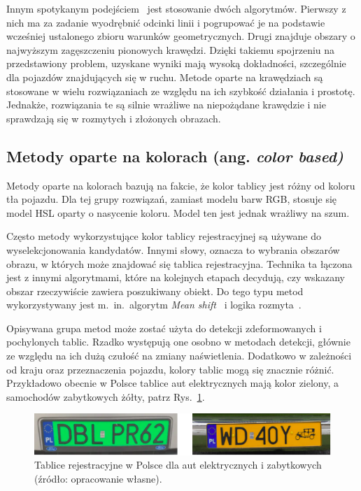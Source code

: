 Innym spotykanym podejściem~\cite{4410602} jest stosowanie dwóch algorytmów.
Pierwszy z nich ma za zadanie wyodrębnić odcinki linii i pogrupować je na podstawie wcześniej ustalonego zbioru warunków geometrycznych.
Drugi znajduje obszary o najwyższym zagęszczeniu pionowych krawędzi.
Dzięki takiemu spojrzeniu na przedstawiony problem, uzyskane wyniki mają wysoką dokładności, szczególnie dla pojazdów znajdujących się w ruchu.
Metode oparte na krawędziach są stosowane w wielu rozwiązaniach ze względu na ich szybkość działania i prostotę.
Jednakże, rozwiązania te są silnie wrażliwe na niepożądane krawędzie i nie sprawdzają się w rozmytych i złożonych obrazach.

\subsection{Metody oparte na kolorach (ang. \textit{color based)}}
\label{subsec:color-based}
Metody oparte na kolorach bazują na fakcie, że kolor tablicy jest różny od koloru tła pojazdu.
Dla tej grupy rozwiązań, zamiast modelu barw RGB, stosuje się model HSL oparty o nasycenie koloru.
Model ten jest jednak wrażliwy na szum.

Często metody wykorzystujące kolor tablicy rejestracyjnej są używane do wyselekcjonowania kandydatów.
Innymi słowy, oznacza to wybrania obszarów obrazu, w których może znajdować się tablica rejestracyjna.
Technika ta łączona jest z innymi algorytmami, które na kolejnych etapach decydują, czy wskazany obszar rzeczywiście zawiera poszukiwany obiekt.
Do tego typu metod wykorzystywany jest m.\ in.\ algorytm \textit{Mean shift}~\cite{1520110} i logika rozmyta~\cite{Wang2008FuzzybasedAF}.

Opisywana grupa metod może zostać użyta do detekcji zdeformowanych i pochylonych tablic.
Rzadko występują one osobno w metodach detekcji, głównie ze względu na ich dużą czułość na zmiany naświetlenia.
Dodatkowo w zależności od kraju oraz przeznaczenia pojazdu, kolory tablic mogą się znacznie różnić.
Przykładowo obecnie w Polsce tablice aut elektrycznych mają kolor zielony, a samochodów zabytkowych żółty, patrz Rys.~\ref{fig:tablice}.
\FloatBarrier
\begin{figure}[!ht]
    \centering
    \includegraphics[scale=0.6]{Pictures/tablice}
    \caption{Tablice rejestracyjne w Polsce dla aut elektrycznych i zabytkowych (źródło: opracowanie własne).}
    \label{fig:tablice}
\end{figure}
\FloatBarrier

